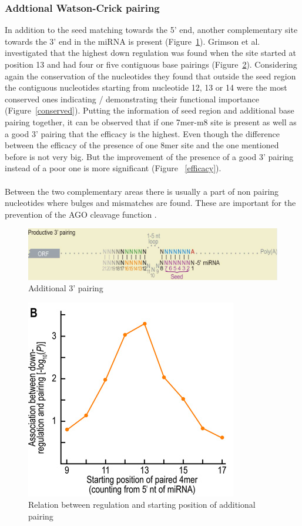 \documentclass[12pt]{article}
\begin{document}
\subsubsection{Addtional Watson-Crick pairing}
In addition to the seed matching towards the 5' end, another complementary site towards the 3' end in the miRNA is present (Figure~\ref{addipairing}). Grimson et al. \cite{Grimson} investigated that the highest down regulation was found when the site started at position 13 and had four or five contiguous base pairings (Figure~\ref{siteregulation}). Considering again the conservation of the nucleotides they found that outside the seed region the contiguous nucleotides starting from nucleotide 12, 13 or 14 were the most conserved ones indicating / demonstrating their functional importance (Figure~\ref{conserved}). Putting the information of seed region and additional base pairing together, it can be observed that if one 7mer-m8 site is present as well as a good 3' pairing that the efficacy is the highest. Even though the difference between the efficacy of the presence of one 8mer site and the one mentioned before is not very big. But the improvement of the presence of a good 3' pairing instead of a poor one is more significant (Figure ~\ref{efficacy}).  \\\\
Between the two complementary areas there is usually a part of non pairing nucleotides where bulges and mismatches are found. These are important for the prevention of the AGO cleavage function \cite{Filipowicz}.

\begin{figure}
\centering
\includegraphics[scale=0.3]{results/additional_pairing.PNG}
\caption{Additional 3' pairing}
\label{addipairing}
\end{figure}

\begin{figure}
\centering
\includegraphics[scale=0.4]{results/sites_regulation.PNG} 
\caption{Relation between regulation and starting position of additional pairing}
\label{siteregulation}
\end{figure}
\end{document}
